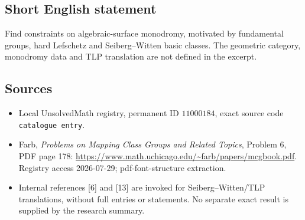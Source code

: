 \documentclass[11pt]{article}
\begin{document}
\subsection{Short English statement}
Find constraints on algebraic-surface monodromy, motivated by fundamental groups, hard Lefschetz and Seiberg--Witten basic classes. The geometric category, monodromy data and TLP translation are not defined in the excerpt.
\subsection{Sources}
\begin{itemize}
\item Local UnsolvedMath registry, permanent ID \(11000184\), exact source code \texttt{catalogue entry}.
\item Farb, \emph{Problems on Mapping Class Groups and Related Topics}, Problem 6, PDF page 178: \url{https://www.math.uchicago.edu/~farb/papers/mcgbook.pdf}. Registry access 2026-07-29; pdf-font-structure extraction.
\item Internal references [6] and [13] are invoked for Seiberg--Witten/TLP translations, without full entries or statements. No separate exact result is supplied by the research summary.
\end{itemize}
\end{document}
